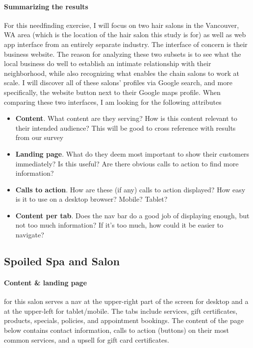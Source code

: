 \paragraph{Summarizing the results}
For this needfinding exercise, I will focus on two hair salons in the Vancouver, WA area (which is the location of the hair salon this study is for) as well as web app interface from an entirely separate industry. The interface of concern is their business website. The reason for analyzing these two subsets is to see what the local business do well to establish an intimate relationship with their neighborhood, while also recognizing what enables the chain salons to work at scale. I will discover all of these salons' profiles via Google search, and more specifically, the website button next to their Google maps profile. When comparing these two interfaces, I am looking for the following attributes
\begin{itemize}
\item
  \textbf{Content}. What content are they serving? How is this content relevant to their intended audience? This will be good to cross reference with results from our survey
\item
  \textbf{Landing page}. What do they deem most important to show their customers immediately? Is this useful? Are there obvious calls to action to find more information?
\item
  \textbf{Calls to action}. How are these (if any) calls to action displayed? How easy is it to use on a desktop browser? Mobile? Tablet?
\item
  \textbf{Content per tab}. Does the nav bar do a good job of displaying enough, but not too much information? If it's too much, how could it be easier to navigate?
\end{itemize}

\subsection{Spoiled Spa and Salon}

\paragraph{Content & landing page}
for this salon serves a nav at the upper-right part of the screen for desktop and a  at the upper-left for tablet/mobile. The tabs include services, gift certificates, products, specials, policies, and appointment bookings. The content of the page below contains contact information, calls to action (buttons) on their most common services, and a upsell for gift card certificates.

